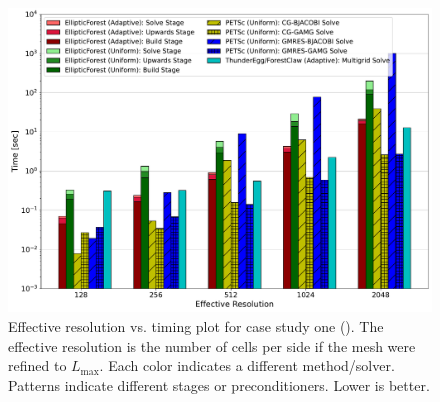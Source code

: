     \begin{figure}
        \centering
        \includegraphics[width=1.0\textwidth, clip=true, trim={0 0 0 0}]{figures/case01-stacked-bar-plot-comparisons-no-title.pdf}
        \caption{Effective resolution vs. timing plot for case study one (). The effective resolution is the number of cells per side if the mesh were refined to $L_{\text{max}}$. Each color indicates a different method/solver. Patterns indicate different stages or preconditioners. Lower is better.}
        \label{fig:case01-stacked-bar-plot}
    \end{figure}


